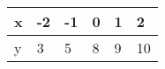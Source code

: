 \begin{tabular}{|l|l|l|l|l|l|}
\hline
x & -2 & -1 & 0 & 1 & 2  \\ \hline
y & 3  & 5  & 8 & 9 & 10 \\ \hline
\end{tabular}
